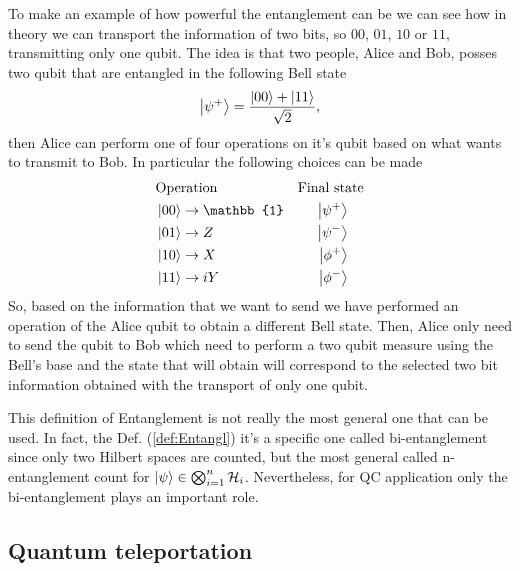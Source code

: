 \ex{}
{
    To make an example of how powerful the entanglement can be we can see how in theory we can transport the information of two bits, so $00$, $01$, $10$ or $11$, transmitting only one qubit. The idea is that two people, Alice and Bob, posses two qubit that are entangled in the following Bell state
    \begin{equation}
        \ket{\psi^+} = \frac{\ket{00} + \ket{11}}{\sqrt{2}},
    \end{equation}
    then Alice can perform one of four operations on it's qubit based on what wants to transmit to Bob. In particular the following choices can be made
    \begin{align*}
        &\text{Operation}               &\text{Final state}\\
        &\ket{00} \to \mathbb{1}        &\ket{\psi^+}\hspace{0.4cm}\\
        &\ket{01} \to Z                 &\ket{\psi^-}\hspace{0.4cm}\\
        &\ket{10} \to X                 &\ket{\phi^+}\hspace{0.4cm}\\
        &\ket{11} \to iY                &\ket{\phi^-}\hspace{0.4cm}
    \end{align*}
    So, based on the information that we want to send we have performed an operation of the Alice qubit to obtain a different Bell state. Then, Alice only need to send the qubit to Bob which need to perform a two qubit measure using the Bell's base and the state that will obtain will correspond to the selected two bit information obtained with the transport of only one qubit.
}

\nt
{
    This definition of Entanglement is not really the most general one that can be used. In fact, the Def. (\ref{def:Entangl}) it's a specific one called bi-entanglement since only two Hilbert spaces are counted, but the most general called n-entanglement count for $\ket{\psi}\in \bigotimes_{i=1}^n \mathcal{H}_i$. Nevertheless, for QC application only the bi-entanglement plays an important role.
}

\subsection{Quantum teleportation}

